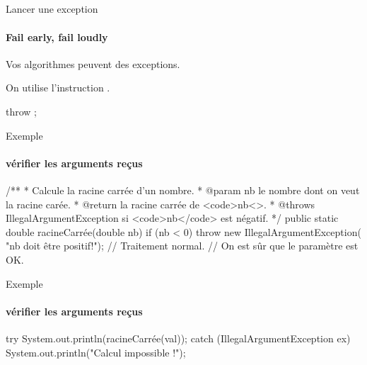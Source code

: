 \subsection{}
\begin{frame}[fragile]{Lancer une exception}
  \framesubtitle{Fail early, fail loudly}

  Vos algorithmes peuvent  des exceptions.

  \pause
  On utilise l'instruction .

  \pause
  \begin{grammaire}
    throw ;
  \end{grammaire}
\end{frame}

\begin{frame}[fragile]{Exemple}
  \framesubtitle{vérifier les arguments reçus}

\begin{java}
/**
 * Calcule la racine carrée d'un nombre.
 * @param nb le nombre dont on veut la racine carée.
 * @return la racine carrée de <code>nb<\code>.
 * @throws IllegalArgumentException si <code>nb</code> est négatif.
 */
public static double racineCarrée(double nb) {
    if (nb < 0) {
        throw new IllegalArgumentException(
            "nb doit être positif!");
    }
    // Traitement normal.
    // On est sûr que le paramètre est OK.
}
\end{java}
\end{frame}

\begin{frame}[fragile]{Exemple}
  \framesubtitle{vérifier les arguments reçus}
\begin{java}
try {
    System.out.println(racineCarrée(val));
} catch (IllegalArgumentException ex) {
    System.out.println("Calcul impossible !");
}
\end{java}
\end{frame}


